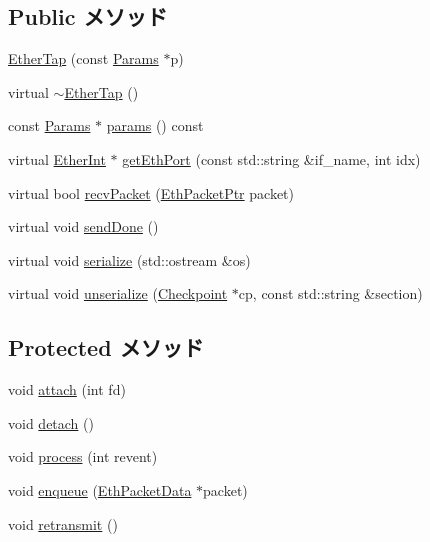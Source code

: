 \subsection*{Public メソッド}
\begin{DoxyCompactItemize}
\item 
\hyperlink{classEtherTap_aa3bb2beb8fedbc7bc7ef9fc307dd5273}{EtherTap} (const \hyperlink{classEtherTap_a0d1f916d5d6c5769fc7f043e0f4a6372}{Params} $\ast$p)
\item 
virtual \hyperlink{classEtherTap_a75a9896777a8e11027761d41865c4e6d}{$\sim$EtherTap} ()
\item 
const \hyperlink{classEtherTap_a0d1f916d5d6c5769fc7f043e0f4a6372}{Params} $\ast$ \hyperlink{classEtherTap_acd3c3feb78ae7a8f88fe0f110a718dff}{params} () const 
\item 
virtual \hyperlink{classEtherInt}{EtherInt} $\ast$ \hyperlink{classEtherTap_a10260c5a583c0894dcdcd1ced50a53ae}{getEthPort} (const std::string \&if\_\-name, int idx)
\item 
virtual bool \hyperlink{classEtherTap_ad54e71348f53dfb5444979e9bfaf3164}{recvPacket} (\hyperlink{classRefCountingPtr}{EthPacketPtr} packet)
\item 
virtual void \hyperlink{classEtherTap_aa1f5a3f61e2513049769a9ca8b16ea2d}{sendDone} ()
\item 
virtual void \hyperlink{classEtherTap_ad6272f80ae37e8331e3969b3f072a801}{serialize} (std::ostream \&os)
\item 
virtual void \hyperlink{classEtherTap_af22e5d6d660b97db37003ac61ac4ee49}{unserialize} (\hyperlink{classCheckpoint}{Checkpoint} $\ast$cp, const std::string \&section)
\end{DoxyCompactItemize}
\subsection*{Protected メソッド}
\begin{DoxyCompactItemize}
\item 
void \hyperlink{classEtherTap_a9b8a915c2058dbc784c223ff9b93f1a5}{attach} (int fd)
\item 
void \hyperlink{classEtherTap_ac295bade8aee589f6718dfa79edc2a34}{detach} ()
\item 
void \hyperlink{classEtherTap_aedacbaeee0c89ceca526874c34f6b20b}{process} (int revent)
\item 
void \hyperlink{classEtherTap_a8d24b6b1d120220c6238bcdd262b3533}{enqueue} (\hyperlink{classEthPacketData}{EthPacketData} $\ast$packet)
\item 
void \hyperlink{classEtherTap_a27657409da52b498bd5607ef71586b44}{retransmit} ()
\end{DoxyCompactItemize}
